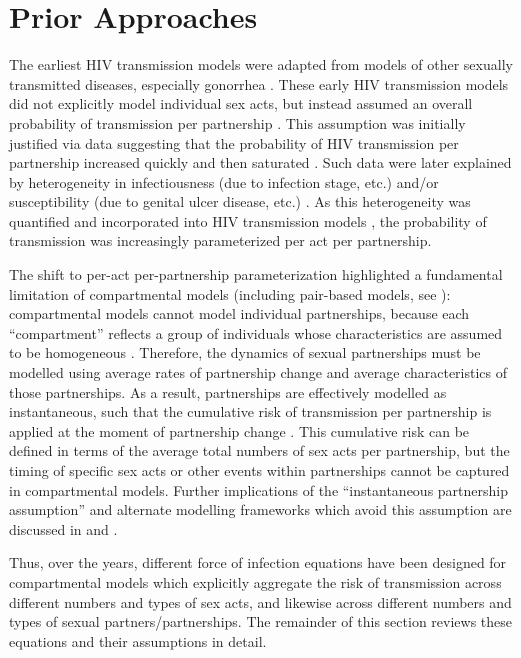 \section{Prior Approaches}\label{foi.prior}
The earliest HIV transmission models \cite{Anderson1986}
were adapted from models of other sexually transmitted diseases,
especially gonorrhea \cite{Yorke1978,Nold1980,Hethcote1982}.
These early HIV transmission models did not explicitly model individual sex acts,
but instead assumed an overall probability of transmission per partnership \cite{Isham1988}.
This assumption was initially justified via data suggesting that
the probability of HIV transmission per partnership
increased quickly and then saturated \cite{Kaplan1990}.
Such data were later explained by heterogeneity in
infectiousness (\eg due to infection stage, etc.) and/or
susceptibility (\eg due to genital ulcer disease, etc.)
\cite{Gray2001,Rottingen2002,Boily2009}.
As this heterogeneity was quantified \cite{Gray2001}
and incorporated into HIV transmission models \cite{Moghadas2003},
the probability of transmission was increasingly parameterized per act \vs per partnership.
\par
The shift to per-act \vs per-partnership parameterization highlighted
a fundamental limitation of compartmental models
(including pair-based models, see ):
compartmental models cannot model individual partnerships,
because each ``compartment'' reflects a group of individuals
whose characteristics are assumed to be homogeneous \cite{Rao2021}.
Therefore, the dynamics of sexual partnerships must be modelled using
average rates of partnership change and average characteristics of those partnerships.
As a result, partnerships are effectively modelled as instantaneous, such that
the cumulative risk of transmission per partnership
is applied at the moment of partnership change \cite{Dietz1988a}.
This cumulative risk can be defined in terms of
the average total numbers of sex acts per partnership,
but the timing of specific sex acts or other events within partnerships
cannot be captured in compartmental models.
Further implications of the ``instantaneous partnership assumption''
and alternate modelling frameworks which avoid this assumption
are discussed in  and .
\par
Thus, over the years, different force of infection equations
have been designed for compartmental models which
explicitly aggregate the risk of transmission across different numbers and types of sex acts,
and likewise across different numbers and types of sexual partners/partnerships.
The remainder of this section reviews these equations and their assumptions in detail.
